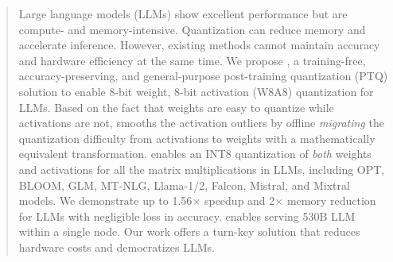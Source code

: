 \begin{abstract}
    Large language models (LLMs) show excellent performance but are compute- and memory-intensive.
    Quantization can reduce memory and accelerate inference.
    However, existing methods cannot maintain accuracy and hardware efficiency at the same time.
    We propose \method, a training-free, accuracy-preserving, and general-purpose post-training quantization (PTQ) solution to enable 8-bit weight, 8-bit activation (W8A8) quantization for LLMs.
    Based on the fact that weights are easy to quantize while activations are not, \method smooths the activation outliers by offline \textit{migrating} the quantization difficulty from activations to weights with a mathematically equivalent transformation.
    \method enables an INT8 quantization of \textit{both} weights and activations for all the matrix multiplications in LLMs, including OPT, BLOOM, GLM, MT-NLG, Llama-1/2, Falcon, Mistral, and Mixtral models. 
    We demonstrate up to 1.56$\times$ speedup and 2$\times$ memory reduction for LLMs with negligible loss in accuracy.
    \method enables serving 530B LLM within a single node. Our work offers a turn-key solution that reduces hardware costs and democratizes LLMs. 
\end{abstract}
